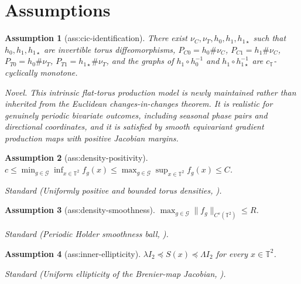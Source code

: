 \documentclass{article}
\newtheorem{assumption}{Assumption}
\begin{document}
\section{Assumptions}

\begin{assumption}[ass:cic-identification]\label{ass:cic-identification}
There exist \(\nu_C,\nu_T,h_0,h_1,h_{1\star}\) such that \(h_0,h_1,h_{1\star}\) are invertible torus diffeomorphisms, \(P_{C0}=h_0\#\nu_C\), \(P_{C1}=h_1\#\nu_C\), \(P_{T0}=h_0\#\nu_T\), \(P_{T1}=h_{1\star}\#\nu_T\), and the graphs of \(h_1\circ h_0^{-1}\) and \(h_1\circ h_{1\star}^{-1}\) are \(c_{\mathbb T}\)-cyclically monotone.
\par\smallskip\noindent\emph{Novel.} This intrinsic flat-torus production model is newly maintained rather than inherited from the Euclidean changes-in-changes theorem. It is realistic for genuinely periodic bivariate outcomes, including seasonal phase pairs and directional coordinates, and it is satisfied by smooth equivariant gradient production maps with positive Jacobian margins.
\end{assumption}

\begin{assumption}[ass:density-positivity]\label{ass:density-positivity}
\(c\leq\min_{g\in\mathcal G}\inf_{x\in\mathbb T^2}f_g(x)\leq\max_{g\in\mathcal G}\sup_{x\in\mathbb T^2}f_g(x)\leq C\).
\par\smallskip\noindent\emph{Standard} (Uniformly positive and bounded torus densities, \cite{ManoleBalakrishnanNilesWeedWasserman2023CLT}).
\end{assumption}

\begin{assumption}[ass:density-smoothness]\label{ass:density-smoothness}
\(\max_{g\in\mathcal G}\lVert f_g\rVert_{C^s(\mathbb T^2)}\leq R\).
\par\smallskip\noindent\emph{Standard} (Periodic Holder smoothness ball, \cite{ManoleBalakrishnanNilesWeedWasserman2023CLT}).
\end{assumption}

\begin{assumption}[ass:inner-ellipticity]\label{ass:inner-ellipticity}
\(\lambda I_2\preceq S(x)\preceq\Lambda I_2\) for every \(x\in\mathbb T^2\).
\par\smallskip\noindent\emph{Standard} (Uniform ellipticity of the Brenier-map Jacobian, \cite{HutterRigollet2021Minimax}).
\end{assumption}
\end{document}
